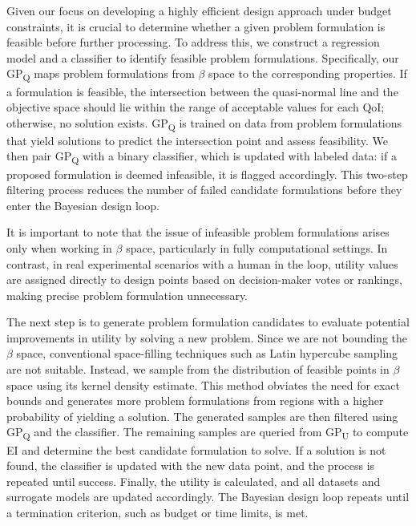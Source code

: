 \documentclass[final,5p,times,twocolumn]{elsarticle}
\begin{document}
Given our focus on developing a highly efficient design approach under budget constraints, it is crucial to determine whether a given problem formulation is feasible before further processing. To address this, we construct a regression model and a classifier to identify feasible problem formulations. Specifically, our GP\textsubscript{Q} maps problem formulations from $\beta$ space to the corresponding properties. If a formulation is feasible, the intersection between the quasi-normal line and the objective space should lie within the range of acceptable values for each QoI; otherwise, no solution exists. GP\textsubscript{Q} is trained on data from problem formulations that yield solutions to predict the intersection point and assess feasibility. We then pair GP\textsubscript{Q} with a binary classifier, which is updated with labeled data: if a proposed formulation is deemed infeasible, it is flagged accordingly. This two-step filtering process reduces the number of failed candidate formulations before they enter the Bayesian design loop.

It is important to note that the issue of infeasible problem formulations arises only when working in $\beta$ space, particularly in fully computational settings. In contrast, in real experimental scenarios with a human in the loop, utility values are assigned directly to design points based on decision-maker votes or rankings, making precise problem formulation unnecessary.

The next step is to generate problem formulation candidates to evaluate potential improvements in utility by solving a new problem. Since we are not bounding the $\beta$ space, conventional space-filling techniques such as Latin hypercube sampling are not suitable. Instead, we sample from the distribution of feasible points in $\beta$ space using its kernel density estimate. This method obviates the need for exact bounds and generates more problem formulations from regions with a higher probability of yielding a solution. The generated samples are then filtered using GP\textsubscript{Q} and the classifier. The remaining samples are queried from GP\textsubscript{U} to compute EI and determine the best candidate formulation to solve. If a solution is not found, the classifier is updated with the new data point, and the process is repeated until success. Finally, the utility is calculated, and all datasets and surrogate models are updated accordingly. The Bayesian design loop repeats until a termination criterion, such as budget or time limits, is met.
\end{document}
